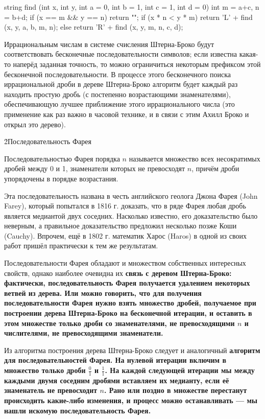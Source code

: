 \code
string find (int x, int y, int a = 0, int b = 1, int c = 1, int d = 0) {
	int m = a+c,  n = b+d;
	if (x == m && y == n)
		return "";
	if (x * n < y * m)
		return 'L' + find (x, y, a, b, m, n);
	else
		return 'R' + find (x, y, m, n, c, d);
}
\endcode

Иррациональным числам в системе счисления Штерна-Броко будут соответствовать бесконечные последовательности символов; если известна какая-то наперёд заданная точность, то можно ограничиться некоторым префиксом этой бесконечной последовательности. В процессе этого бесконечного поиска иррациональной дроби в дереве Штерна-Броко алгоритм будет каждый раз находить простую дробь (с постепенно возрастающими знаменателями), обеспечивающую лучшее приближение этого иррационального числа (это применение как раз важно в часовой технике, и в связи с этим Ахилл Броко и открыл это дерево).

\h2{Последовательность Фарея}

Последовательностью Фарея порядка $n$ называется множество всех несократимых дробей между 0 и 1, знаменатели которых не превосходят $n$, причём дроби упорядочены в порядке возрастания.

Эта последовательность названа в честь английского геолога Джона Фарея (John Farey), который попытался в 1816 г. доказать, что в ряде Фарея любая дробь является медиантой двух соседних. Насколько известно, его доказательство было неверным, а правильное доказательство предложил несколько позже Коши (Cauchy). Впрочем, ещё в 1802 г. математик Харос (Haros) в одной из своих работ пришёл практически к тем же результатам.

Последовательности Фарея обладают и множеством собственных интересных свойств, однако наиболее очевидна их \bf{связь с деревом Штерна-Броко}: фактически, последовательность Фарея получается удалением некоторых ветвей из дерева. Или можно говорить, что для получения последовательности Фарея нужно взять множество дробей, получаемое при построении дерева Штерна-Броко на бесконечной итерации, и оставить в этом множестве только дроби со знаменателями, не превосходящими $n$ и числителями, не превосходящими знаменатели.

Из алгоритма построения дерева Штерна-Броко следует и аналогичный \bf{алгоритм} для последовательностей Фарея. На нулевой итерации включим в множество только дроби $\frac{0}{1}$ и $\frac{1}{1}$. На каждой следующей итерации мы между каждыми двумя соседним дробями вставляем их медианту, если её знаменатель не превосходит $n$. Рано или поздно в множестве перестанут происходить какие-либо изменения, и процесс можно останавливать --- мы нашли искомую последовательность Фарея.

